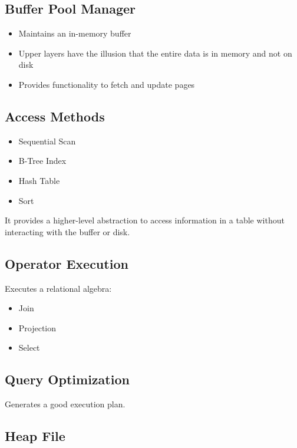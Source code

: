 \documentclass{article}
\begin{document}
\subsection{Buffer Pool Manager}

\begin{itemize}
    \item Maintains an in-memory buffer
    \item Upper layers have the illusion that the entire data is in memory and not on
          disk
    \item Provides functionality to fetch and update pages
\end{itemize}

\subsection{Access Methods}

\begin{itemize}
    \item Sequential Scan
    \item B-Tree Index
    \item Hash Table
    \item Sort
\end{itemize}
It provides a higher-level abstraction to access information in a table without
interacting with the buffer or disk.

\subsection{Operator Execution}

Executes a relational algebra:

\begin{itemize}
    \item Join
    \item Projection
    \item Select
\end{itemize}

\subsection{Query Optimization}

Generates a good execution plan.

\subsection{Heap File}
\end{document}
